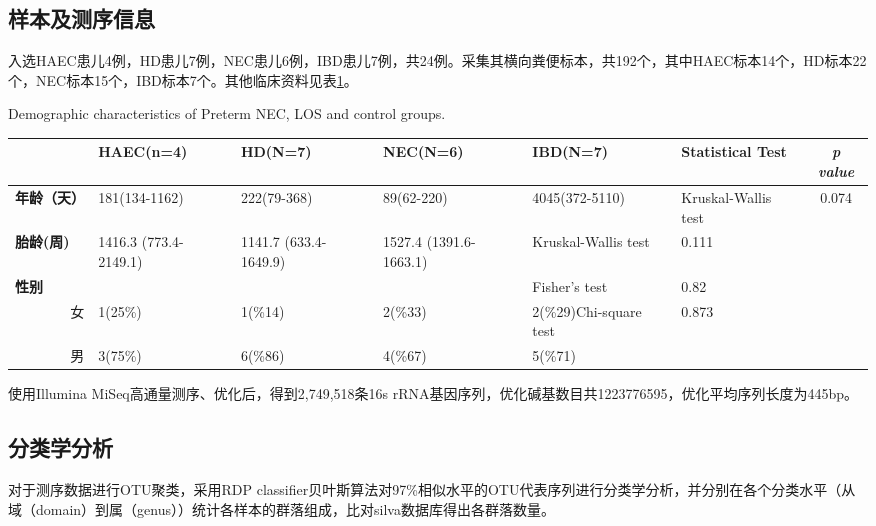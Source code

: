   \subsection{样本及测序信息}
  入选HAEC患儿4例，HD患儿7例，NEC患儿6例，IBD患儿7例，共24例。采集其横向粪便标本，共192个，其中HAEC标本14个，HD标本22个，NEC标本15个，IBD标本7个。其他临床资料见表\ref{tab:comparedemographic}。

  \begin{table}[!hpb]
    \centering
      {Demographic characteristics of Preterm NEC, LOS and control groups.}
    \label{tab:comparedemographic}
    \begin{tabular}{lp{1.8cm}p{1.8cm}p{1.8cm}p{1.8cm}p{2cm}c}
      \toprule
         & \textbf{HAEC(n=4)} & \textbf{HD(N=7)} & \textbf{NEC(N=6)} & \textbf{IBD(N=7)} & \textbf{Statistical Test} & \textit{p value} \\ \midrule
        \textbf{年龄（天）} & 181(134-1162) & 222(79-368) & 89(62-220) & 4045(372-5110) & Kruskal-Wallis test & 0.074 \\
        \textbf{胎龄(周)} & 1416.3 (773.4-2149.1) & 1141.7 (633.4-1649.9) & 1527.4 (1391.6-1663.1) & Kruskal-Wallis test & 0.111 \\
        \textbf{性别} &  &  &  & Fisher's test & 0.82 \\
        \multicolumn{1}{r}{女} & 1(25\%) & 1(\%14) & 2(\%33) & 2(\%29)Chi-square test & 0.873\\
        \multicolumn{1}{r}{男} & 3(75\%) & 6(\%86) & 4(\%67) & 5(\%71) &  &\\
         \bottomrule
    \end{tabular}
  \end{table}


  使用Illumina MiSeq高通量测序、优化后，得到2,749,518条16s rRNA基因序列，优化碱基数目共1223776595，优化平均序列长度为445bp。

  \subsection{分类学分析}
  对于测序数据进行OTU聚类，采用RDP classifier贝叶斯算法对97\%相似水平的OTU代表序列进行分类学分析，并分别在各个分类水平（从域（domain）到属（genus））统计各样本的群落组成，比对silva数据库得出各群落数量。

